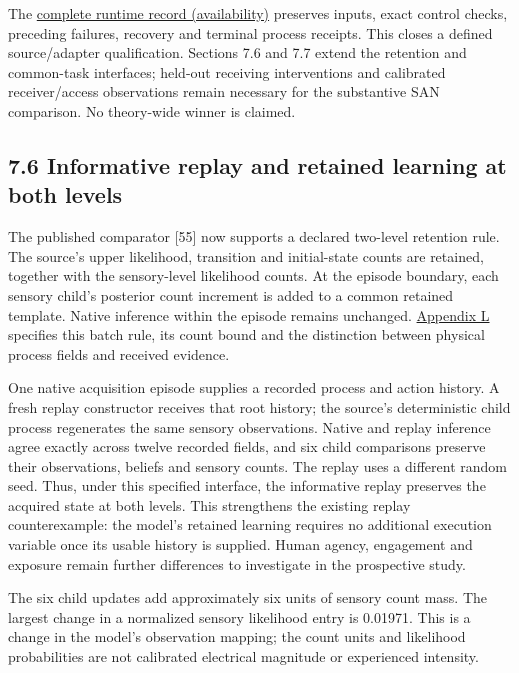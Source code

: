 \documentclass[
  american,
  11pt,
  letterpaper,
]{article}
\begin{document}
The \href{https://github.com/v5ma/v5ma.github.io/blob/master/papers/companions/learning-to-feel-v1.0/ARTIFACT-AVAILABILITY.md\#artifact-39}{complete runtime record (availability)} preserves inputs, exact control checks, preceding failures, recovery and terminal process receipts. This closes a defined source/adapter qualification. Sections 7.6 and 7.7 extend the retention and common-task interfaces; held-out receiving interventions and calibrated receiver/access observations remain necessary for the substantive SAN comparison. No theory-wide winner is claimed.

\subsection{7.6 Informative replay and retained learning at both levels}\label{informative-replay-and-retained-learning-at-both-levels}

The published comparator {[}55{]} now supports a declared two-level retention rule. The source's upper likelihood, transition and initial-state counts are retained, together with the sensory-level likelihood counts. At the episode boundary, each sensory child's posterior count increment is added to a common retained template. Native inference within the episode remains unchanged. \href{https://zenodo.org/records/23455801/files/Learning-to-Feel-Technical-Supplement-v1.1.pdf\#appendix-l}{Appendix L} specifies this batch rule, its count bound and the distinction between physical process fields and received evidence.

One native acquisition episode supplies a recorded process and action history. A fresh replay constructor receives that root history; the source's deterministic child process regenerates the same sensory observations. Native and replay inference agree exactly across twelve recorded fields, and six child comparisons preserve their observations, beliefs and sensory counts. The replay uses a different random seed. Thus, under this specified interface, the informative replay preserves the acquired state at both levels. This strengthens the existing replay counterexample: the model's retained learning requires no additional execution variable once its usable history is supplied. Human agency, engagement and exposure remain further differences to investigate in the prospective study.

The six child updates add approximately six units of sensory count mass. The largest change in a normalized sensory likelihood entry is 0.01971. This is a change in the model's observation mapping; the count units and likelihood probabilities are not calibrated electrical magnitude or experienced intensity.
\end{document}

